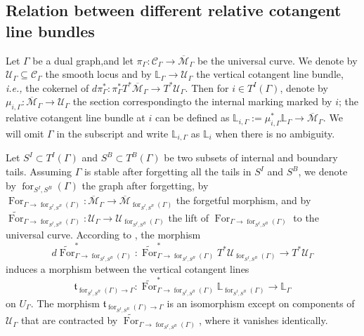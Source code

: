 \documentclass[11pt]{amsart}
\theoremstyle{definition}
\theoremstyle{remark}
\renewcommand{\for}{\operatorname{for}}
\newcommand{\For}{\operatorname{For}}
\newcommand{\<}{\left<}
\renewcommand{\>}{\right>}
\numberwithin{equation}{section}
\def\Mbar{{\overline{\mathcal M}}}
\begin{document}
\subsection{Relation between different relative cotangent line bundles}\label{sec cotangent lines relation}
Let $\Gamma$ be a %
dual graph,and let %
$\pi_{\Gamma}\colon\mathcal C_{\Gamma}\to \Mbar_{\Gamma}$ be the universal curve. We denote by %
$\mathcal U_{\Gamma}\subseteq \mathcal C_{\Gamma}$  the %
smooth locus and %
by $\mathbb L_{\Gamma}\to \mathcal U_{\Gamma}$ the vertical cotangent line bundle, \textit{i.e.,} the cokernel of $d\pi^*_{\Gamma}\colon \pi^*_{\Gamma} T^*\Mbar_{\Gamma}\to T^* \mathcal U_{\Gamma}$. Then for $i\in T^I(\Gamma)$, denote by $\mu_{i,\Gamma}\colon \Mbar_{\Gamma}\to \mathcal U_{\Gamma}$ the %
section correspondingto the %
internal marking marked %
by $i$; the %
relative cotangent line bundle at $i$ can be defined as $\mathbb L_{i,\Gamma}:=\mu_{i,\Gamma}^*\mathbb L_{\Gamma} \to \Mbar_{\Gamma}$. We will omit $\Gamma$ in the subscript and write $\mathbb L_{i,\Gamma}$ as $\mathbb L_{i}$ when there is no ambiguity.


Let $S^I\subset T^I(\Gamma)$ and $S^B\subset T^B(\Gamma)$ be two subsets of internal and boundary tails. Assuming $\Gamma$ is stable after forgetting all the tails in $S^I$ and $S^B$, we denote by $\for_{{S^I,S^B}}(\Gamma)$ the graph after forgetting, by $\For_{\Gamma \to \for_{{S^I,S^B}}(\Gamma)}\colon \Mbar_\Gamma\to \Mbar_{\for_{{S^I,S^B}}(\Gamma)}$ the forgetful morphism, and by $\widetilde{\For}_{\Gamma \to \for_{{S^I,S^B}}(\Gamma)}\colon \mathcal U_{\Gamma} \to \mathcal U_{\for_{{S^I,S^B}}(\Gamma)}$ the lift of $\For_{\Gamma \to \for_{{S^I,S^B}}(\Gamma)}$ to the universal curve. According to \cite[\S3.5]{PST14}, the morphism 
$$d\widetilde{\For}^*_{\Gamma \to \for_{{S^I,S^B}}(\Gamma)}\colon \widetilde{\For}_{\Gamma \to \for_{{S^I,S^B}}(\Gamma)}^*T^*\mathcal U_{\for_{{S^I,S^B}}(\Gamma)}\to T^*\mathcal U_{\Gamma}$$ induces a morphism between the vertical cotangent lines $$\mathfrak t_{\for_{{S^I,S^B}}(\Gamma)\to \Gamma}\colon \widetilde{\For}_{\Gamma\to \for_{{S^I,S^B}}(\Gamma)}^*\mathbb L_{\for_{{S^I,S^B}}(\Gamma)}\to \mathbb L_{\Gamma}$$
on $U_{\Gamma}$.
The morphism $\mathfrak t_{\for_{{S^I,S^B}}(\Gamma)\to\Gamma}$ is an isomorphism except %
on components of %
$\mathcal U_{\Gamma}$ that are contracted by $\widetilde{\For}_{\Gamma \to \for_{{S^I,S^B}}(\Gamma)}$, where it vanishes identically. 
\end{document}
